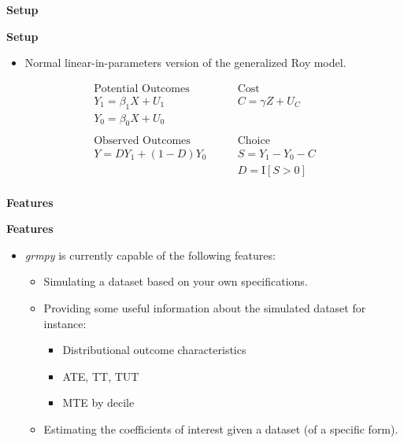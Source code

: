 \begin{frame}\begin{center}
\LARGE\textbf{Setup}
\end{center}\end{frame}



\begin{frame}
\textbf{Setup}
\begin{itemize}\setlength\itemsep{1em}
\item Normal linear-in-parameters version of the generalized Roy model.
\end{itemize}
\begin{align*}
\text{Potential Outcomes} &\qquad \text{Cost} \\
Y_1 = \beta_1 X + U_1      &\qquad C = \gamma Z + U_C \\
Y_0 = \beta_0 X + U_0      &\qquad \\
    & \\
\text{Observed Outcomes}  &\qquad \text{Choice} \\
Y = D Y_1 + (1 - D)Y_0 &\qquad S = Y_1 - Y_0 - C \\
                       &\qquad D = \mathrm{I}[S > 0] \\
\end{align*}
\end{frame}

\begin{frame}\begin{center}
\LARGE\textbf{Features}
\end{center}\end{frame}

\begin{frame}
\textbf{Features}
\begin{itemize}\setlength\itemsep{1em}
\item \textit{grmpy} is currently capable of the following features:
\begin{itemize}\setlength\itemsep{1em}
  \item Simulating a dataset based on your own specifications.
  \item Providing some useful information about the simulated dataset for instance:
    \begin{itemize}\setlength\itemsep{1em}
    \item Distributional outcome characteristics
    \item ATE, TT, TUT
    \item MTE by decile
    \end{itemize}
  \item Estimating the coefficients of interest given a dataset (of a specific form).
\end{itemize}
\end{itemize}

\end{frame}

